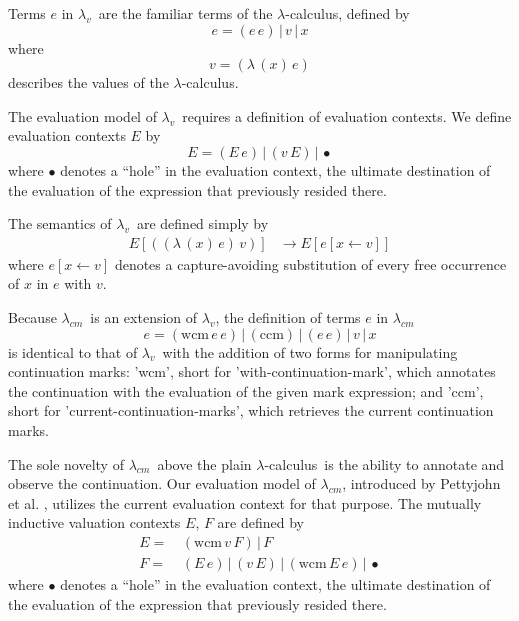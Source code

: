 \documentclass{llncs}
\newcommand{\cm}[0]{$\lambda_{cm}$}
\newcommand{\lv}[0]{$\lambda_v$}
\newcommand{\lc}[0]{$\lambda$-calculus}
\newcommand{\wcm}[2]{(\mathrm{wcm}\,#1\,#2)}
\newcommand{\ccm}[0]{(\mathrm{ccm})}
\newcommand{\app}[2]{(#1\,#2)}
\newcommand{\abs}[2]{(\lambda\,(#1)\,#2)}
\newcommand{\hole}[0]{\bullet}
\newcommand{\rr}[0]{\rightarrow}
\begin{document}
Terms $e$ in \lv\ are the familiar terms of the \lc, defined by
\begin{equation}
e=\app{e}{e}\,|\,v\,|\,x
\end{equation}
where 
\begin{equation}
v=\abs{x}{e}
\end{equation}
describes the values of the \lc.

The evaluation model of \lv\ requires a definition of evaluation contexts. We define evaluation contexts $E$ by
\begin{equation}
E=\app{E}{e}\,|\,\app{v}{E}\,|\,\hole
\end{equation}
where $\hole$ denotes a ``hole'' in the evaluation context, the ultimate destination of the evaluation of the expression that previously resided there.

The semantics of \lv\ are defined simply by
\begin{align}
E[\app{\abs{x}{e}}{v}]  &\rr E[e[x\leftarrow v]]
\end{align}
where $e[x\leftarrow v]$ denotes a capture-avoiding substitution of every free occurrence of $x$ in $e$ with $v$.

Because \cm\ is an extension of \lv, the definition of terms $e$ in \cm\ 
\begin{equation}
e=\wcm{e}{e}\,|\,\ccm\,|\,\app{e}{e}\,|\,v\,|\,x
\end{equation}
is identical to that of \lv\ with the addition of two forms for manipulating continuation marks: \scheme'wcm', short for \scheme'with-continuation-mark', which annotates the continuation with the evaluation of the given mark expression; and \scheme'ccm', short for \scheme'current-continuation-marks', which retrieves the current continuation marks.

The sole novelty of \cm\ above the plain \lc\ is the ability to annotate and observe the continuation. Our evaluation model of \cm, introduced by Pettyjohn et al. \cite{pettyjohn2005continuations}, utilizes the current evaluation context for that purpose. The mutually inductive valuation contexts $E$, $F$ are defined by
\begin{align}
E=\, &\wcm{v}{F}\,|\,F\\
F=\, &\app{E}{e}\,|\,\app{v}{E}\,|\,\wcm{E}{e}\,|\,\hole
\end{align}
where $\hole$ denotes a ``hole'' in the evaluation context, the ultimate destination of the evaluation of the expression that previously resided there.
\end{document}

